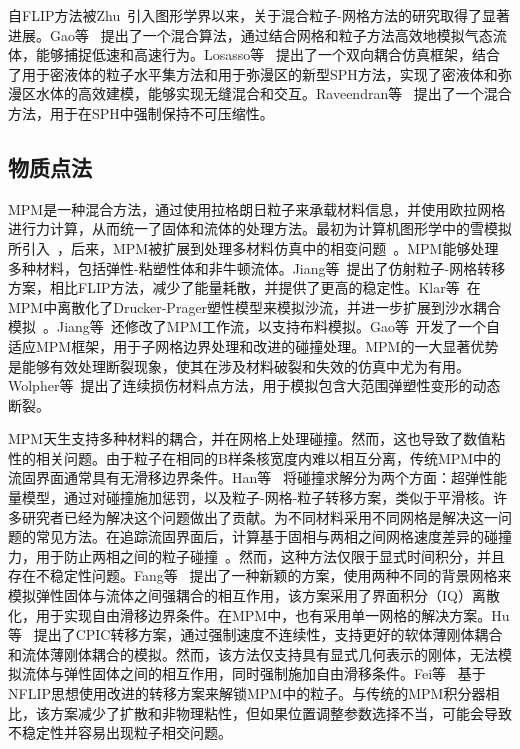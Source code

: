 自FLIP方法被Zhu~\cite{zhu2005animating}引入图形学界以来，关于混合粒子-网格方法的研究取得了显著进展。Gao等~\cite{gao2009simulating} 提出了一个混合算法，通过结合网格和粒子方法高效地模拟气态流体，能够捕捉低速和高速行为。Losasso等~\cite{losasso2008two} 提出了一个双向耦合仿真框架，结合了用于密液体的粒子水平集方法和用于弥漫区的新型SPH方法，实现了密液体和弥漫区水体的高效建模，能够实现无缝混合和交互。Raveendran等~\cite{raveendran2011hybrid} 提出了一个混合方法，用于在SPH中强制保持不可压缩性。

\subsection{物质点法}
MPM是一种混合方法，通过使用拉格朗日粒子来承载材料信息，并使用欧拉网格进行力计算，从而统一了固体和流体的处理方法。最初为计算机图形学中的雪模拟所引入~\cite{stomakhin2013material}，后来，MPM被扩展到处理多材料仿真中的相变问题~\cite{stomakhin2014augmented}。MPM能够处理多种材料，包括弹性-粘塑性体和非牛顿流体。Jiang等~\cite{jiang2015affine}提出了仿射粒子-网格转移方案，相比FLIP方法，减少了能量耗散，并提供了更高的稳定性。Klar等~\cite{klar2016drucker}在MPM中离散化了Drucker-Prager塑性模型来模拟沙流，并进一步扩展到沙水耦合模拟~\cite{tampubolon2017multi}。Jiang等~\cite{jiang2017anisotropic}还修改了MPM工作流，以支持布料模拟。Gao等~\cite{gao2017adaptive}开发了一个自适应MPM框架，用于子网格边界处理和改进的碰撞处理。MPM的一大显著优势是能够有效处理断裂现象，使其在涉及材料破裂和失效的仿真中尤为有用。Wolpher等~\cite{wolper2019cd}提出了连续损伤材料点方法，用于模拟包含大范围弹塑性变形的动态断裂。

MPM天生支持多种材料的耦合，并在网格上处理碰撞。然而，这也导致了数值粘性的相关问题。由于粒子在相同的B样条核宽度内难以相互分离，传统MPM中的流固界面通常具有无滑移边界条件。Han等~\cite{han2019hybrid} 将碰撞求解分为两个方面：超弹性能量模型，通过对碰撞施加惩罚，以及粒子-网格-粒子转移方案，类似于平滑核。许多研究者已经为解决这个问题做出了贡献。为不同材料采用不同网格是解决这一问题的常见方法。在追踪流固界面后，计算基于固相与两相之间网格速度差异的碰撞力，用于防止两相之间的粒子碰撞~\cite{yan2018mpm,han2019hybrid}。然而，这种方法仅限于显式时间积分，并且存在不稳定性问题。Fang等~\cite{fang2020iq} 提出了一种新颖的方案，使用两种不同的背景网格来模拟弹性固体与流体之间强耦合的相互作用，该方案采用了界面积分（IQ）离散化，用于实现自由滑移边界条件。在MPM中，也有采用单一网格的解决方案。Hu等~\cite{hu2018moving} 提出了CPIC转移方案，通过强制速度不连续性，支持更好的软体薄刚体耦合和流体薄刚体耦合的模拟。然而，该方法仅支持具有显式几何表示的刚体，无法模拟流体与弹性固体之间的相互作用，同时强制施加自由滑移条件。Fei等~\cite{fei2021revisiting} 基于NFLIP思想使用改进的转移方案来解锁MPM中的粒子。与传统的MPM积分器相比，该方案减少了扩散和非物理粘性，但如果位置调整参数选择不当，可能会导致不稳定性并容易出现粒子相交问题。

